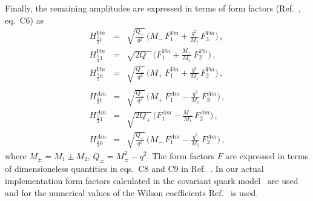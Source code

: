 Finally, the remaining amplitudes are expressed in terms of form factors
(Ref.~\cite{Gutsche:2013pp}, eq.~C6) as
\begin{align}
H^{Vm}_{\frac{1}{2} t} &=&
\sqrt{\frac{Q_+}{q^2}} \,
\biggl( M_- \, F_1^{Vm} + \frac{q^2}{M_1} \, F_3^{Vm} \biggr)\,, \nonumber\\
H^{Vm}_{\frac{1}{2} 1} &=& \sqrt{2 Q_-} \,
\biggl( F_1^{Vm} + \frac{M_+}{M_1} \, F_2^{Vm} \biggr)\,, \nonumber\\
H^{Vm}_{\frac{1}{2} 0} &=& \sqrt{\frac{Q_-}{q^2}} \,
\biggl( M_+ \, F_1^{Vm} + \frac{q^2}{M_1} \, F_2^{Vm} \biggr)\,, \nonumber\\
&&\\
H^{Am}_{\frac{1}{2} t} &=& \sqrt{\frac{Q_-}{q^2}} \,
\biggl( M_+ \, F_1^{Am} - \frac{q^2}{M_1} \, F_3^{Am} \biggr)\,, \nonumber\\
H^{Am}_{\frac{1}{2} 1} &=& \sqrt{2 Q_+} \,
\biggl( F_1^{Am} - \frac{M_-}{M_1} \, F_2^{Am} \biggr)\,, \nonumber\\
H^{Am}_{\frac{1}{2} 0} &=& \sqrt{\frac{Q_+}{q^2}} \,
\biggl( M_- \, F_1^{Am}  - \frac{q^2}{M_1} \, F_2^{Am} \biggr)\,, \nonumber
\end{align}
where $M_\pm = M_1 \pm M_2$, $Q_\pm = M_\pm^2 - q^2$. %
The form factors $F$ are expressed in terms of dimensioneless quantities in
eqs.~C8 and C9 in Ref.~\cite{Gutsche:2013pp}. In our actual implementation form factors calculated in the covariant
quark model~\cite{Gutsche:2013pp} are used and for the numerical values of the Wilson coefficients
Ref.~\cite{Gutsche:2013pp} is used. 

